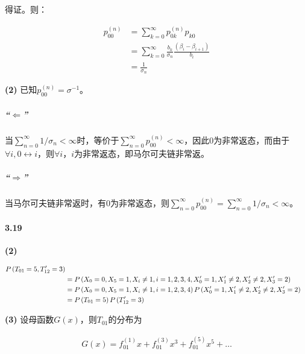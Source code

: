 \documentclass{../notes}
\begin{document}
得证。则：

\begin{equation}
    \begin{aligned}
        p_{00}^{(n)}
         & = \sum_{k=0}^\infty p_{0k}^{(n)}p_{k0}                                         \\
         & = \sum_{k=0}^\infty \frac{b_k}{\sigma_{n}} \frac{(\beta_i - \beta_{i+1})}{b_i} \\
         & = \frac{1}{\sigma_n}
    \end{aligned}
\end{equation}

\textbf{(2)} 已知$p_{00}^{(n)} = \sigma^{-1}$。

\subparagraph*{“$\Leftarrow$”} 当$\sum_{n=0}^\infty 1/\sigma_n < \infty$时，等价于$\sum_{n=0}^\infty p_{00}^{(n)} < \infty$，因此$0$为非常返态，而由于$\forall i, 0\leftrightarrow i$，则$\forall i$，$i$为非常返态，即马尔可夫链非常返。

\subparagraph*{“$\Rightarrow$”} 当马尔可夫链非常返时，有$0$为非常返态，则$\sum_{n=0}^\infty p_{00}^{(n)} = \sum_{n=0}^\infty 1/\sigma_n < \infty$。

\paragraph*{3.19} 

\textbf{(2)} 

\begin{equation}
    \begin{aligned}
        P\left(T_{01} = 5, T_{12}' = 3\right) \\
        & = P\left(X_0 = 0, X_5 = 1, X_{i}\not = 1, i=1, 2, 3, 4, X_0' = 1, X_1'\not = 2, X_2'\not = 2, X_3' = 2\right) \\
        &= P\left(X_0 = 0, X_5 = 1, X_{i}\not = 1, i=1, 2, 3, 4\right)P\left(X_0'=1, X_1'\not = 2, X_2'\not = 2, X_3' = 2\right) \\
        &= P\left(T_{01} = 5\right)P\left(T_{12}' = 3\right)
    \end{aligned}
\end{equation}

\textbf{(3)} 设母函数$G(x)$，则$T_{01}$的分布为

\begin{equation}
    \begin{aligned}
        G(x) = f_{01}^{(1)}x + f_{01}^{(3)}x^3 + f_{01}^{(5)}x^5 + \dots \\
    \end{aligned}
\end{equation}
\end{document}
